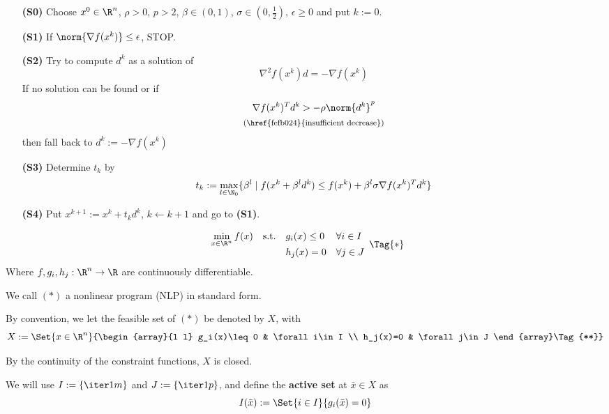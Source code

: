 \begin{enumerate}
	\item [\textbf{(S0)}] Choose $x^0\in\R^n$, $\rho>0$, $p>2$, $\beta\in(0,1)$, $\sigma\in(0,\frac12)$, $\epsilon\geq0$ and put $k:=0$.
	\item [\textbf{(S1)}] If $\norm{\nabla f(x^k)}\leq\epsilon$, STOP.
	\item [\textbf{(S2)}] Try to compute $d^k$ as a solution of
	      $$\nabla^2f(x^k)d=-\nabla f(x^k)$$
	      If no solution can be found or if
	      \begin{gather*}
		      \nabla f(x^k)^Td^k>-\rho\norm{d^k}^p\\
		      \text{\footnotesize{(\href{fefb024}{insufficient decrease})}}
	      \end{gather*}
	      then fall back to $d^k:=-\nabla f(x^k)$
	\item [\textbf{(S3)}] Determine $t_k$ by
	      $$t_k:=\max_{l\in\N_0}\{\beta^l\mid f(x^k+\beta^ld^k)\leq f(x^k)+\beta^l\sigma\nabla f(x^k)^Td^k\}$$
	\item [\textbf{(S4)}] Put $x^{k+1}:=x^k+t_kd^k$, $k\gets k+1$ and go to \textbf{(S1)}.
\end{enumerate}

\label{bbe9993}

\begin{equation*}
	\begin{array}{l l l l}
		\displaystyle \min_{x\in\R^n}f(x)
		 & \text{s.t.} & g_i(x)\leq0 & \forall i\in I \\
		 &             & h_j(x)=0    & \forall j\in J
	\end{array}\Tag{*}
\end{equation*}
Where $f,g_i,h_j:\R^n\to\R$ are continuously differentiable.

We call $(*)$ a nonlinear program (NLP) in standard form.

By convention, we let the feasible set of $(*)$ be denoted by $X$, with
\begin{equation*}
	X:=\Set{x\in\R^n}{\begin{array}{l l}
			g_i(x)\leq0 & \forall i\in I \\
			h_j(x)=0    & \forall j\in J
		\end{array}\Tag{**}}
\end{equation*}

By the continuity of the constraint functions, $X$ is closed.

We will use $I:=\{\iter1m\}$ and $J:=\{\iter1p\}$, and define the
\textbf{active set} at $\bar x\in X$ as
$$
	I(\bar x):=\Set{i\in I}{g_i(\bar x)=0}
$$

